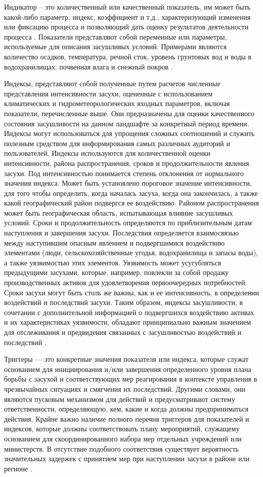 Индикатор – это количественный или качественный показатель, им может быть какой-либо параметр, индекс, коэффициент и т.д., характеризующий изменения или фиксацию процесса и позволяющий дать оценку результатов деятельности процесса \cite{Rakhmatova2017}.
Показатели представляют собой переменные или параметры, используемые для описания засушливых условий. Примерами являются количество осадков, температура, речной сток, уровень грунтовых вод и воды в водохранилищах, почвенная влага и снежный покров \cite{Handbook2016}.

Индексы, представляют собой полученные путем расчетов численные представления интенсивности засухи, оцененные с использованием климатических и гидрометеорологических входных параметров, включая показатели, перечисленные выше. Они предназначены для оценки качественного состояния засушливости на данном ландшафте за конкретный период времени. Индексы могут использоваться для упрощения сложных соотношений и служить полезным средством для информирования самых различных аудиторий и пользователей. Индексы используются для количественной оценки интенсивности, района распространения, сроков и продолжительности явления засухи. Под интенсивностью понимается степень отклонения от нормального значения индекса. Может быть установлено пороговое значение интенсивности, для того чтобы определить, когда началась засуха, когда она закончилась, а также какой географический район подвергся ее воздействию. Районом распространения может быть географическая область, испытывающая влияние засушливых условий. Сроки и продолжительность определяются по приблизительным датам наступления и завершения засухи. Последствия определяется взаимосвязью между наступившим опасным явлением и подвергшимися воздействию элементами (люди, сельскохозяйственные угодья, водохранилища и запасы воды), а также уязвимостью этих элементов. Уязвимость может усугубляться предыдущими засухами, которые, например, повлекли за собой продажу производственных активов для удовлетворения первоочередных потребностей. Сроки засухи могут быть столь же важны, как и ее интенсивность, в определении воздействий и последствий засухи. Таким образом, индексы засушливости, в сочетании с дополнительной информацией о подвергшихся воздействию активах и их характеристиках уязвимости, обладают принципиально важным значением для отслеживания и предвидения связанных с засушливостью воздействий и последствий \cite{Handbook2016}.

Триггеры — это конкретные значения показателя или индекса, которые служат основанием для инициирования и/или завершения определенного уровня плана борьбы с засухой и соответствующих мер реагирования в контексте управления в чрезвычайных ситуациях и смягчения их последствий. Другими словами, они являются пусковым механизмом для действий и предусматривают систему ответственности, определяющую, кем, какие и когда должны предприниматься действия. Крайне важно наличие полного перечня триггеров для показателей и индексов, которые должны соответствовать плану мероприятий, служащему основанием для скоординированного набора мер отдельных учреждений или министерств. В отсутствие подобного соответствия существует вероятность значительных задержек с принятием мер при наступлении засухи в районе или регионе \cite{Handbook2016}.

